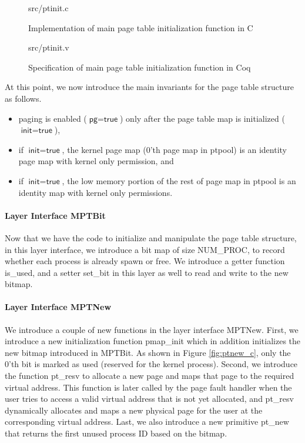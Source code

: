 \begin{figure}
	 {src/ptinit.c}
	\caption{Implementation of main page table initialization function in C}
	\label{fig:ptinit_c}
\end{figure}

\begin{figure}
	 {src/ptinit.v}
	\caption{Specification of main page table initialization function in Coq}
	\label{fig:ptinit_v}
\end{figure}

At this point, we now introduce the main invariants for the page table structure as follows.

\begin{invariant}
\begin{itemize}
\item paging is enabled ($\textsf{pg}=\textsf{true}$) only after the page table map is initialized ($\textsf{init}=\textsf{true}$),
\item if $\textsf{init}=\textsf{true}$, the kernel page map (0'th page map in \textsf{ptpool}) is an identity page map with kernel only permission, and
\item if $\textsf{init}=\textsf{true}$, the low memory portion of the rest of page map in \textsf{ptpool} is an identity map with kernel only permissions.
\end{itemize}
\end{invariant}

\paragraph{Layer Interface MPTBit}

Now that we have the code to initialize and manipulate the page table structure, in this layer interface,
we introduce a bit map of size \textsf{NUM\_PROC}, to record whether each process is already spawn or
free. We introduce a getter function \textsf{is\_used}, and a setter \textsf{set\_bit} in this layer as well to
read and write to the new bitmap.


\paragraph{Layer Interface MPTNew}

We introduce a couple of new functions in the layer interface MPTNew.
First, we introduce a new initialization function \textsf{pmap\_init} which in addition initializes the new bitmap introduced in MPTBit.
As shown in Figure \ref{fig:ptnew_c}, only the 0'th bit is marked as used (reserved for the kernel process).
Second, we introduce the function \textsf{pt\_resv} to allocate a new page and maps that page to the required virtual address.
This function is later called by the page fault handler when the user tries to access a valid virtual address that is not yet allocated,
and \textsf{pt\_resv} dynamically allocates and maps a new physical page for the user at the corresponding virtual address.
Last, we also introduce a new primitive \textsf{pt\_new} that returns the first unused process ID based on the bitmap.

